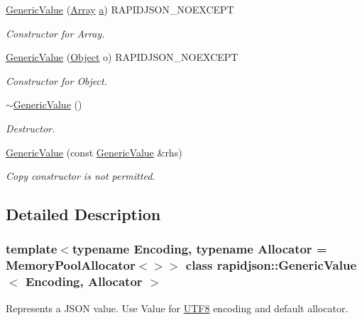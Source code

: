 \begin{DoxyCompactItemize}
\mbox{\hyperlink{classrapidjson_1_1_generic_value_a77b0f41557b3c34b57a180698312c4a8}{Generic\+Value}} (\mbox{\hyperlink{classrapidjson_1_1_generic_value_a81291ad1031afe43aca4719e2989d7dc}{Array}} \mbox{\hyperlink{namespacerapidjson_a11fce64e721729aaf6be4a485c78f231}{a}}) R\+A\+P\+I\+D\+J\+S\+O\+N\+\_\+\+N\+O\+E\+X\+C\+E\+PT
\begin{DoxyCompactList}\small\item\em Constructor for Array. \end{DoxyCompactList}\item 
\mbox{\hyperlink{classrapidjson_1_1_generic_value_a893da1069660536fd3943a0149206a6e}{Generic\+Value}} (\mbox{\hyperlink{classrapidjson_1_1_generic_value_ae1b1a60a9c69ce5ac48b8c445e3e9231}{Object}} o) R\+A\+P\+I\+D\+J\+S\+O\+N\+\_\+\+N\+O\+E\+X\+C\+E\+PT
\begin{DoxyCompactList}\small\item\em Constructor for Object. \end{DoxyCompactList}\item 
\mbox{\hyperlink{classrapidjson_1_1_generic_value_a433a64b466c80cadf7d1acaa6f065437}{$\sim$\+Generic\+Value}} ()
\begin{DoxyCompactList}\small\item\em Destructor. \end{DoxyCompactList}\item 
\mbox{\hyperlink{classrapidjson_1_1_generic_value_ac423236e77125622f67072332bb72dc3}{Generic\+Value}} (const \mbox{\hyperlink{classrapidjson_1_1_generic_value}{Generic\+Value}} \&rhs)
\begin{DoxyCompactList}\small\item\em Copy constructor is not permitted. \end{DoxyCompactList}\end{DoxyCompactItemize}


\subsection{Detailed Description}
\subsubsection*{template$<$typename Encoding, typename Allocator = Memory\+Pool\+Allocator$<$$>$$>$\newline
class rapidjson\+::\+Generic\+Value$<$ Encoding, Allocator $>$}

Represents a J\+S\+ON value. Use Value for \mbox{\hyperlink{structrapidjson_1_1_u_t_f8}{U\+T\+F8}} encoding and default allocator. 

